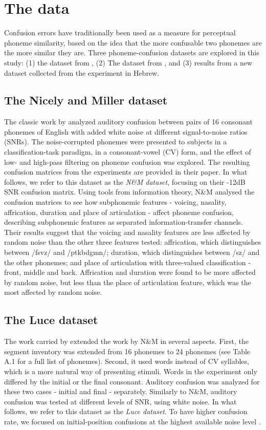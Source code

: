 \section{The data}
Confusion errors have traditionally been used as a measure for perceptual phoneme similarity, based on the idea that the more confusable two phonemes are the more similar they are. Three phoneme-confusion datasets are explored in this study: (1) the dataset from \citet{NicelyMiller1955}, (2) The dataset from \citet{Luce1987}, and (3) results from a new dataset collected from the experiment in Hebrew.

\subsection{The Nicely and Miller dataset} The classic work by \citet{NicelyMiller1955} analyzed auditory confusion between pairs of 16 consonant phonemes of English with added white noise at different signal-to-noise ratios (SNRs). The noise-corrupted phonemes were presented to subjects in a classification-task paradigm, in a consonant-vowel (CV) form, and the effect of low- and high-pass filtering on phoneme confusion was explored. The resulting confusion matrices from the experiments are provided in their paper. In what follows, we refer to this dataset as the \textit{N\&M dataset}, focusing on their -12dB SNR confusion matrix. Using tools from information theory, N\&M analysed the confusion matrices to see how subphonemic features - voicing, nasality, affrication, duration and place of articulation - affect phoneme confusion, describing subphonemic features as separated information-transfer channels. Their results suggest that the voicing and nasality features are less affected by random noise than the other three features tested: affrication, which distinguishes between /fsvz/ and /ptkbdgmn/; duration, which distinguishes between /sz/ and the other phonemes; and place of articulation with three-valued classification - front, middle and back. Affrication and duration were found to be more affected by random noise, but less than the place of articulation feature, which was the most affected by random noise. 

\subsection{The Luce dataset} The work carried by \citet{Luce1987} extended the work by N\&M in several aspects. First, the segment inventory was extended from 16 phonemes to 24 phonemes (see Table A.1 for a full list of phonemes). Second, it used words instead of CV syllables, which is a more natural way of presenting stimuli. Words in the experiment only differed by the initial or the final consonant. Auditory confusion was analyzed for these two cases - initial and final - separately. Similarly to N\&M, auditory confusion was tested at different levels of SNR, using white noise. In what follows, we refer to this dataset as the \textit{Luce dataset}. To have higher confusion rate, we focused on initial-position confusions at the highest available noise level \citep{Redford1999}.

